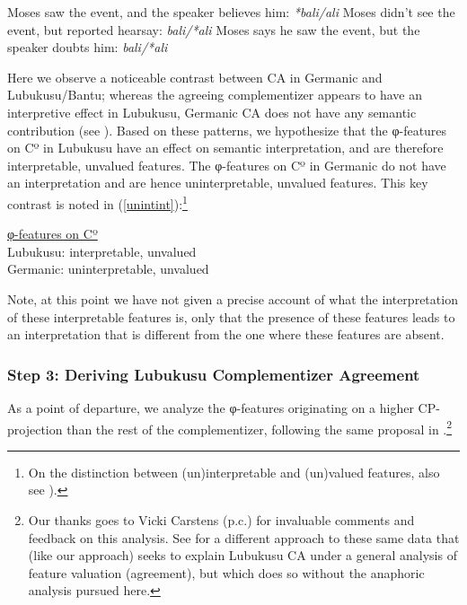 \documentclass[output=paper
,modfonts
,nonflat
]{langsci/langscibook}
\begin{document}
\begin{xlist}
\ex Moses saw the event, and the speaker believes him: \textit{*bali/ali}
\ex Moses didn't see the event, but reported hearsay: \textit{bali/*ali}
\ex Moses says he saw the event, but the speaker doubts him: \textit{bali/*ali}

\end{xlist}

\z

Here we observe a noticeable contrast between CA in Germanic and Lubukusu/Bantu; whereas the agreeing complementizer appears to have an interpretive effect in Lubukusu, Germanic CA does not have any semantic contribution (see \citealt{vanKoppen:2005,vanKoppen:2017}). Based on these patterns, we hypothesize that the φ-features on Cº in Lubukusu have an effect on semantic interpretation, and are therefore interpretable, unvalued features. The φ-features on Cº in Germanic do not have an interpretation and are hence uninterpretable, unvalued features. This key contrast is noted in (\ref{unintint}):\footnote{On the distinction between (un)interpretable and (un)valued features, also see  \citet{Pesetsky:2007}).}

\ea \label{unintint}

\underline{φ-features on Cº} \\
Lubukusu: interpretable, unvalued \\
Germanic: uninterpretable, unvalued

\z

Note, at this point we have not given a precise account of what the interpretation of these interpretable features is, only that the presence of these features leads to an interpretation that is different from the one where these features are absent.   

\subsubsection{Step 3: Deriving Lubukusu Complementizer Agreement}

As a point of departure, we analyze the φ-features originating on a higher CP-projection than the rest of the complementizer, following the same proposal in \citet{Carstens:2016}.\footnote{Our thanks goes to Vicki Carstens (p.c.) for invaluable comments and feedback on this analysis. See \citet{Carstens:2016} for a different approach to these same data that (like our approach) seeks to explain Lubukusu CA under a general analysis of feature valuation (agreement), but which does so without the anaphoric analysis pursued here.}
\end{document}
